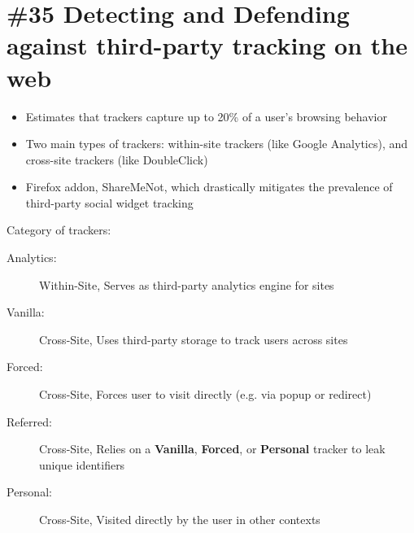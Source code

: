 \section{\#35 Detecting and Defending against third-party tracking on the web}
\begin{itemize}
	\item Estimates that trackers capture up to 20\% of a user's browsing behavior
	\item Two main types of trackers: within-site trackers (like Google Analytics), and cross-site trackers (like DoubleClick)
	\item Firefox addon, ShareMeNot, which drastically mitigates the prevalence of third-party social widget tracking
\end{itemize}
Category of trackers:
\begin{description}
	\item[Analytics:] Within-Site, Serves as third-party analytics engine for sites
	\item[Vanilla:] Cross-Site, Uses third-party storage to track users across sites
	\item[Forced:] Cross-Site, Forces user to visit directly (e.g. via popup or redirect)
	\item[Referred:] Cross-Site, Relies on a \textbf{Vanilla}, \textbf{Forced}, or \textbf{Personal} tracker to leak unique identifiers
	\item[Personal:] Cross-Site, Visited directly by the user in other contexts
\end{description}